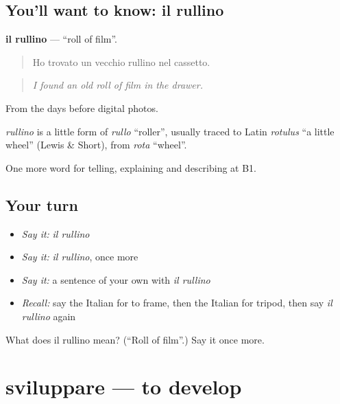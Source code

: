 \subsection*{You'll want to know: il rullino}
\textbf{il rullino} — \textquotedblleft{}roll of film\textquotedblright{}.

\begin{quote}
Ho trovato un vecchio rullino nel cassetto.
\end{quote}

\begin{quote}
\emph{I found an old roll of film in the drawer.}
\end{quote}

From the days before digital photos.

\begin{cousinweb}
\emph{rullino} is a little form of \emph{rullo} \textquotedblleft{}roller\textquotedblright{}, usually traced to Latin \emph{rotulus} \textquotedblleft{}a little wheel\textquotedblright{} (Lewis \& Short), from \emph{rota} \textquotedblleft{}wheel\textquotedblright{}.
\end{cousinweb}

\begin{grammarlens}[title={What you've built}]
One more word for telling, explaining and describing at B1.
\end{grammarlens}

\subsection*{Your turn}
\begin{itemize}
\raggedright
  \item \emph{Say it:} \emph{il rullino}
  \item \emph{Say it:} \emph{il rullino}, once more
  \item \emph{Say it:} a sentence of your own with \emph{il rullino}
  \item \emph{Recall:} say the Italian for to frame, then the Italian for tripod, then say \emph{il rullino} again
\end{itemize}

\begin{tcolorbox}[breakable,colback=teal!4,colframe=teal!35!black,title={Before you move on}]
What does il rullino mean? (\textquotedblleft{}Roll of film\textquotedblright{}.) Say it once more.
\end{tcolorbox}
\section[sviluppare]{sviluppare — to develop}

